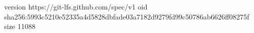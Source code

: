 version https://git-lfs.github.com/spec/v1
oid sha256:5993c5210e52335a4d5828dbfade03a7182d9279fd99c50786ab6626ff08275f
size 11088
